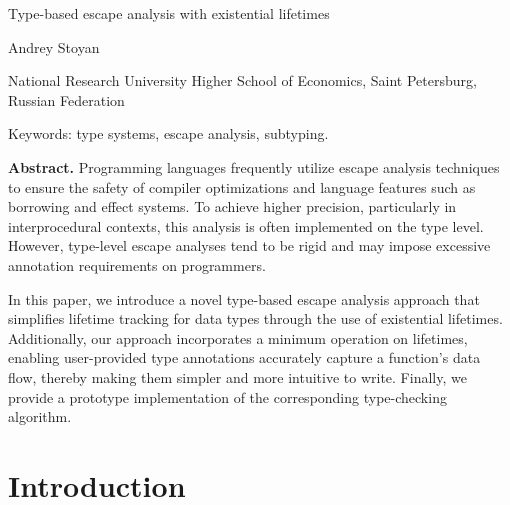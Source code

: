 \documentclass[11pt]{article}
\begin{document}
    \begin{center}
        \LARGE
        Type-based escape analysis with existential lifetimes

        \small
        Andrey Stoyan

        National Research University Higher School of Economics, Saint Petersburg, Russian Federation

        Keywords: type systems, escape analysis, subtyping.
    \end{center}

    \textbf{Abstract.}
    Programming languages frequently utilize escape analysis techniques to ensure the safety of compiler optimizations and language features such as borrowing and effect systems.
    To achieve higher precision, particularly in interprocedural contexts, this analysis is often implemented on the type level.
    However, type-level escape analyses tend to be rigid and may impose excessive annotation requirements on programmers.

    In this paper, we introduce a novel type-based escape analysis approach that simplifies lifetime tracking for data types through the use of existential lifetimes.
    Additionally, our approach incorporates a minimum operation on lifetimes, enabling user-provided type annotations accurately capture a function’s data flow, thereby making them simpler and more intuitive to write.
    Finally, we provide a prototype implementation of the corresponding type-checking algorithm.


    \section{Introduction}




%
\end{document}
